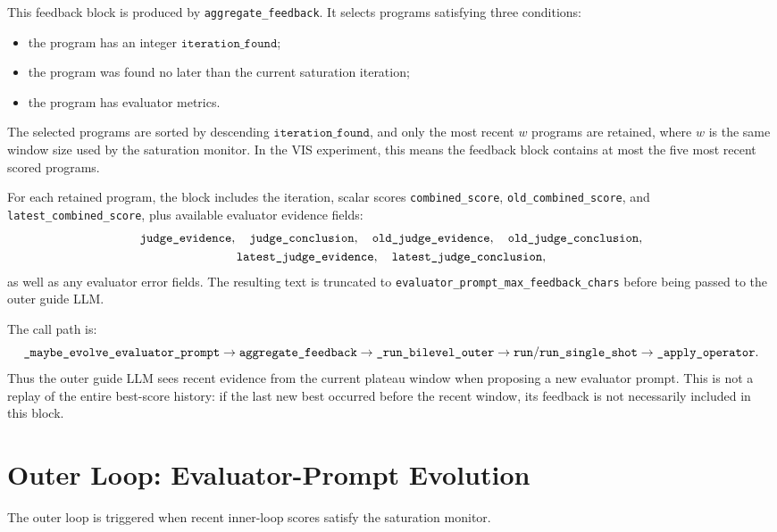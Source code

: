 \documentclass[11pt]{article}
\begin{document}
This feedback block is produced by \texttt{aggregate\_feedback}. It selects
programs satisfying three conditions:
\begin{itemize}
  \item the program has an integer \(\texttt{iteration\_found}\);
  \item the program was found no later than the current saturation iteration;
  \item the program has evaluator metrics.
\end{itemize}
The selected programs are sorted by descending \(\texttt{iteration\_found}\),
and only the most recent \(w\) programs are retained, where \(w\) is the same
window size used by the saturation monitor. In the VIS experiment, this means
the feedback block contains at most the five most recent scored programs.

For each retained program, the block includes the iteration, scalar scores
\texttt{combined\_score}, \texttt{old\_combined\_score}, and
\texttt{latest\_combined\_score}, plus available evaluator evidence fields:
\[
\begin{gathered}
  \text{\texttt{judge\_evidence}},\quad
  \text{\texttt{judge\_conclusion}},\quad
  \text{\texttt{old\_judge\_evidence}},\quad
  \text{\texttt{old\_judge\_conclusion}},\\
  \text{\texttt{latest\_judge\_evidence}},\quad
  \text{\texttt{latest\_judge\_conclusion}},
\end{gathered}
\]
as well as any evaluator error fields. The resulting text is truncated to
\texttt{evaluator\_prompt\_max\_feedback\_chars} before being passed to the
outer guide LLM.

The call path is:
\[
\text{\texttt{\_maybe\_evolve\_evaluator\_prompt}}
\rightarrow
\text{\texttt{aggregate\_feedback}}
\rightarrow
\text{\texttt{\_run\_bilevel\_outer}}
\rightarrow
\text{\texttt{run}}/\text{\texttt{run\_single\_shot}}
\rightarrow
\text{\texttt{\_apply\_operator}}.
\]
Thus the outer guide LLM sees recent evidence from the current plateau window
when proposing a new evaluator prompt. This is not a replay of the entire
best-score history: if the last new best occurred before the recent window, its
feedback is not necessarily included in this block.

\section{Outer Loop: Evaluator-Prompt Evolution}

The outer loop is triggered when recent inner-loop scores satisfy the saturation
monitor. 
\end{document}
